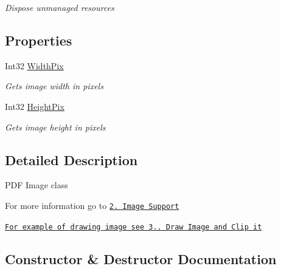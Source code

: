 \begin{DoxyCompactItemize}
\begin{DoxyCompactList}\small\item\em Dispose unmanaged resources \end{DoxyCompactList}\end{DoxyCompactItemize}
\subsection*{Properties}
\begin{DoxyCompactItemize}
\item 
Int32 \hyperlink{class_pdf_file_writer_1_1_pdf_image_ae62470dc162a4bbb1694fe9cffaafd66}{Width\+Pix}
\begin{DoxyCompactList}\small\item\em Gets image width in pixels \end{DoxyCompactList}\item 
Int32 \hyperlink{class_pdf_file_writer_1_1_pdf_image_ad7626d3bdfc15d72775eb1f981a7e600}{Height\+Pix}
\begin{DoxyCompactList}\small\item\em Gets image height in pixels \end{DoxyCompactList}\end{DoxyCompactItemize}


\subsection{Detailed Description}
P\+DF Image class 

For more information go to \href{http://www.codeproject.com/Articles/570682/PDF-File-Writer-Csharp-Class-Library-Version#ImageSupport}{\tt 2. Image Support} 

\href{http://www.codeproject.com/Articles/570682/PDF-File-Writer-Csharp-Class-Library-Version#DrawImage}{\tt For example of drawing image see 3.. Draw Image and Clip it} 

\subsection{Constructor \& Destructor Documentation}
